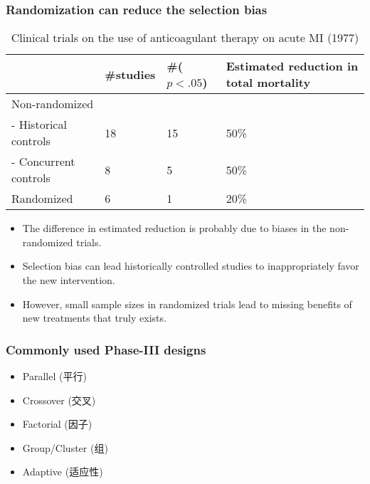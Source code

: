 \documentclass[table,10pt]{beamer}
\begin{document}
\begin{CJK*}{UTF8}{gbsn}
\begin{frame}[t]
\frametitle{Randomization can reduce the selection bias}
\begin{table}
\footnotesize
\caption{Clinical trials on the use of anticoagulant therapy on acute MI (1977)}
\begin{tabular}{p{}|p{}p{}p{}}
\hline
 & \#studies & \#($p<.05$) & Estimated reduction in total mortality\\
\hline
Non-randomized & & & \\
- Historical controls & 18 & 15 & 50\%\\
- Concurrent controls & 8 & 5 & 50\%\\
\hline
Randomized & 6 & 1 & 20\%\\
\hline
\end{tabular}
\end{table}
\begin{itemize}
	\item<2-> The difference in estimated reduction is probably due to biases in 
		the non-randomized trials.
	\item<3-> Selection bias can lead historically controlled studies to inappropriately 
		favor the new intervention.
	\item<4-> However, small sample sizes in randomized trials lead to missing benefits 
		of new treatments that truly exists. 
\end{itemize}
\end{frame}

\begin{frame}[t]
\frametitle{Commonly used Phase-III designs}
\begin{itemize}
	\item Parallel (平行)
	\item Crossover (交叉)
	\item Factorial (因子)
	\item Group/Cluster (组)
	\item Adaptive (适应性)
\end{itemize}
\end{frame}


\end{CJK*}
\end{document}
